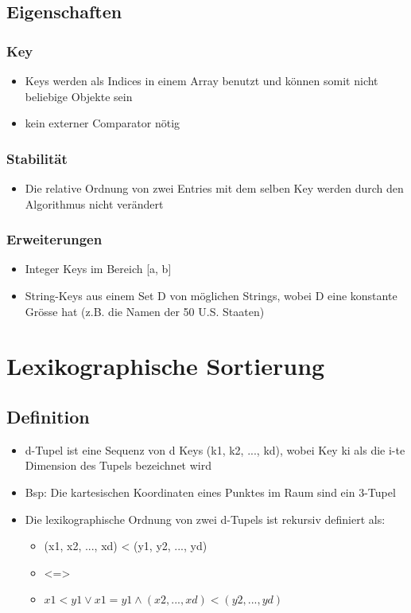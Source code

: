 \subsection{Eigenschaften}
\subsubsection{Key}
\begin{itemize}
    \item Keys werden als Indices in einem Array benutzt und können somit nicht beliebige Objekte sein
    \item kein externer Comparator nötig
\end{itemize}
\subsubsection{Stabilität}
\begin{itemize}
    \item Die relative Ordnung von zwei Entries mit dem selben Key werden durch den Algorithmus nicht verändert
\end{itemize}

\subsubsection{Erweiterungen}
\begin{itemize}
    \item Integer Keys im Bereich [a, b]
    \item String-Keys aus einem Set D von möglichen Strings, wobei D eine konstante Grösse hat (z.B. die Namen der 50 U.S. Staaten)
\end{itemize}


\section{Lexikographische Sortierung}
\subsection{Definition}
\begin{itemize}
    \item d-Tupel ist eine Sequenz von d Keys (k1, k2, ..., kd), wobei Key ki als die i-te Dimension des Tupels bezeichnet wird
    \item Bsp: Die kartesischen Koordinaten eines Punktes im Raum sind ein 3-Tupel
    \item Die lexikographische Ordnung von zwei d-Tupels ist rekursiv definiert als:
    \begin{itemize}
        \item (x1, x2, ..., xd) < (y1, y2, ..., yd)
        \item <=>
        \item $ x1<y1 \vee  x1=y1 \wedge  (x2,...,xd) < (y2,...,yd) $
    \end{itemize}
\end{itemize}


